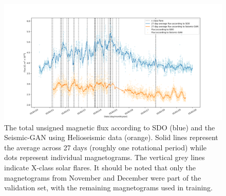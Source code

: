 \documentclass[11pt,a4paper,onecolumn]{report}
\begin{document}
\begin{figure}
  \centering
  \includegraphics[width=\linewidth]{Flux_SDO_Seismic_average.png}
  \caption[]{The total unsigned magnetic flux according to SDO (blue) and the
  Seismic-GAN using Helioseismic data (orange). Solid lines
  represent the average across 27 days (roughly one rotational period) while
  dots represent individual magnetograms. The vertical grey lines indicate
  X-class solar flares. It should be noted that only the magnetograms from
  November and December were part of the validation set, with the remaining
  magnetograms used in training.}
  \label{fig:flux_sdo_seismic}
\end{figure}
\end{document}
